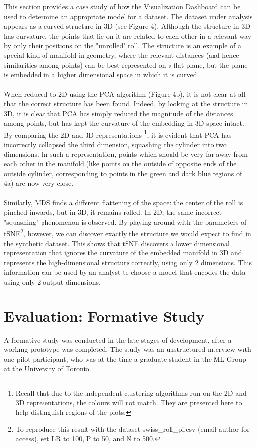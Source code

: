 \documentclass{sigchi}
\begin{document}
%
This section provides a case study of how the Visualization Dashboard can be used to determine an appropriate model for a dataset. %
%
The dataset under analysis appears as a curved structure in 3D (see Figure 4). %
%
Although the structure in 3D has curvature, the points that lie on it are related to each other in a relevant way by only their positions on the "unrolled" roll. %
%
The structure is an example of a special kind of manifold in geometry, where the relevant distances (and hence similarities among points) can be best represented on a flat plane, but the plane is embedded in a higher dimensional space in which it is curved. %
%
\\\\
%
When reduced to 2D using the PCA algorithm (Figure 4b), it is not clear at all that the correct structure has been found. %
%
Indeed, by looking at the structure in 3D, it is clear that PCA has simply reduced the magnitude of the distances among points, but has kept the curvature of the embedding in 3D space intact. %
%
By comparing the 2D and 3D representations%
%
\footnote{Recall that due to the independent clustering algorithms run on the 2D and 3D representations, the colours will not match. They are presented here to help distinguish regions of the plots.}, %
%
it is evident that PCA has incorrectly collapsed the third dimension, squashing the cylinder into two dimensions. %
%
In such a representation, points which should be very far away from each other in the manifold (like points on the outside of opposite ends of the outside cylinder, corresponding to points in the green and dark blue regions of 4a) are now very close. %
%
\\\\
%
Similarly, MDS finds a different flattening of the space: the center of the roll is pinched inwards, but in 3D, it remains rolled. %
In 2D, the same incorrect "squashing" phenomenon is observed. %
%
By playing around with the parameters of tSNE\footnote{To reproduce this result with the dataset swiss\_roll\_pi.csv (email author for access), set LR to 100, P to 50, and N to 500.}, %
however, we can discover exactly the structure we would expect to find in the synthetic dataset. %
%
This shows that tSNE discovers a lower dimensional representation that ignores the curvature of the embedded manifold in 3D and represents the high-dimensional structure correctly, using only 2 dimensions. %
%
This information can be used by an analyst to choose a model that encodes the data using only 2 output dimensions.
%
\section{Evaluation: Formative Study}
A formative study was conducted in the late stages of development, after a working prototype was completed. %
%
The study was an unstructured interview with one pilot participant, who was at the time a graduate student in the ML Group at the University of Toronto. %
%
\end{document}
